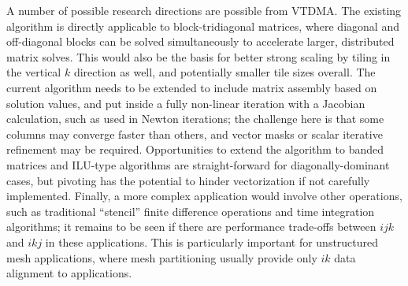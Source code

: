 \documentclass{sig-alternate-05-2015}
\begin{document}
A number of possible research directions are possible from VTDMA.
The existing algorithm is directly applicable to block-tridiagonal matrices,
  where diagonal and off-diagonal blocks can be solved simultaneously
  to accelerate larger, distributed matrix solves.
This would also be the basis for better strong scaling by tiling in
  the vertical $k$ direction as well, and potentially smaller
  tile sizes overall. 
The current algorithm needs to be extended to include matrix assembly
  based on solution values, and put inside a fully non-linear iteration
  with a Jacobian calculation, such as used in Newton iterations;
  the challenge here is that some columns may converge faster than
  others, and vector masks or scalar iterative refinement may be required.
Opportunities to extend the algorithm to banded matrices and ILU-type 
  algorithms are straight-forward for diagonally-dominant cases, but
  pivoting has the potential to hinder vectorization if not carefully
  implemented.
Finally, a more complex application would involve other operations,
  such as traditional ``stencil'' finite difference operations and
  time integration algorithms; it remains to be seen if there are
  performance trade-offs between \(ijk\) and \(ikj\) in 
  these applications.
This is particularly important for unstructured mesh applications,
  where mesh partitioning usually provide only \(ik\) 
  data alignment to applications.




%
\end{document}
